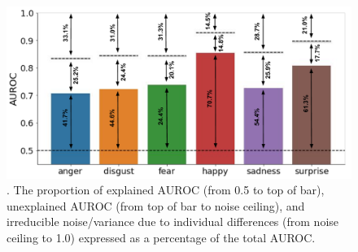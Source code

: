 \documentclass[12pt,american,a4paper,oneside,]{memoir} %
\begin{document}
\begin{figure}
\centering
\includegraphics{_bookdown_files/hypothesis-kernel-analysis-files/figures/figure_S6.pdf}
\caption{\label{fig:fig-hka-S6}. The proportion of explained AUROC (from 0.5 to top of bar), unexplained AUROC (from top of bar to noise ceiling), and irreducible noise/variance due to individual differences (from noise ceiling to 1.0) expressed as a percentage of the total AUROC.}
\end{figure}



\begingroup\fontsize{8}{10}\selectfont
\end{document}
